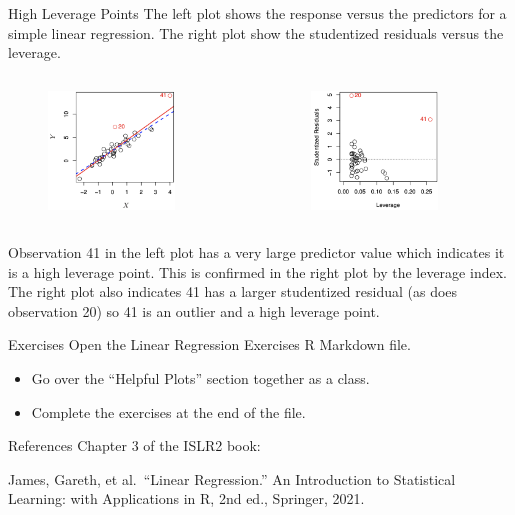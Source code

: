 \documentclass[
  ignorenonframetext,
  aspectratio=169,
]{beamer}
\begin{document}
\begin{frame}{High Leverage Points}
\protect\hypertarget{high-leverage-points-1}{}
The left plot shows the response versus the predictors for a simple
linear regression. The right plot show the studentized residuals versus
the leverage.

\begin{columns}[T]
\begin{column}{0.5\textwidth}
\begin{figure}

{\centering \includegraphics[width=1.32292in,height=\textheight]{images/simple_leverage.png}

}

\end{figure}
\end{column}

\begin{column}{0.5\textwidth}
\begin{figure}

{\centering \includegraphics[width=1.32292in,height=\textheight]{images/multiple_leverage.png}

}

\end{figure}
\end{column}
\end{columns}

Observation 41 in the left plot has a very large predictor value which
indicates it is a high leverage point. This is confirmed in the right
plot by the leverage index. The right plot also indicates 41 has a
larger studentized residual (as does observation 20) so 41 is an outlier
and a high leverage point.
\end{frame}

\begin{frame}{Exercises}
\protect\hypertarget{exercises}{}
Open the Linear Regression Exercises R Markdown file.

\begin{itemize}
\item
  Go over the ``Helpful Plots'' section together as a class.
\item
  Complete the exercises at the end of the file.
\end{itemize}
\end{frame}

\begin{frame}{References}
\protect\hypertarget{references}{}
Chapter 3 of the ISLR2 book:

James, Gareth, et al.~``Linear Regression.'' An Introduction to
Statistical Learning: with Applications in R, 2nd ed., Springer, 2021.
\end{frame}
\end{document}
